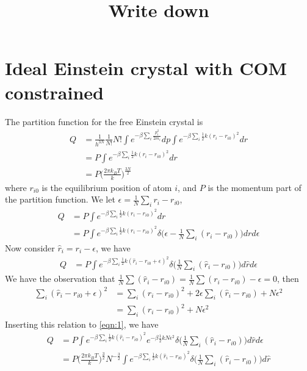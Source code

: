 \documentclass[aps,pre,a4paper,showkeys,fleqn]{revtex4}
\begin{document}
\title{
Write down
}

\maketitle

\section{Ideal Einstein crystal with COM constrained}

The partition function for the free Einstein crystal is
\begin{align*}
  Q & =
      \frac{1}{h^{3N}}
      \frac{1}{N!} N!
      \int e^{-\beta\sum_i\frac{p_i^2}{2m_i}} dp
      \int e^{-\beta\sum_i \frac 12k(r_i - r_{i0})^2} dr \\
    &= 
      P \int e^{-\beta\sum_i \frac 12k(r_i - r_{i0})^2} dr \\
    &=
      P \Big( \frac{2\pi k_BT}{k} \Big)^{\frac{3N}2}
\end{align*}
where $r_{i0}$ is the equilibrium position of atom $i$, and $P$ is the momentum part of the partition function.
We let $\epsilon = \frac1N \sum_i r_i - r_{i0}$,
\begin{align*}
  Q & =
      P \int e^{-\beta\sum_i \frac 12k(r_i - r_{i0})^2} dr \\
    & =
      P \int e^{-\beta\sum_i \frac 12k(r_i - r_{i0})^2} \delta\big( \epsilon - \frac1N \sum_i (r_i - r_{i0}) \big) dr d\epsilon 
\end{align*}
Now consider $\hat r_i = r_i - \epsilon$, we have
\begin{align}\label{eqn:1}
  Q & =
      P \int e^{-\beta\sum_i \frac 12k(\hat r_i - r_{i0} + \epsilon)^2} \delta\big( \frac1N \sum_i (\hat r_i - r_{i0}) \big) d\hat r d\epsilon 
\end{align}
We have the observation that $ \frac 1N \sum (\hat r_i  - r_{i0}) = \frac 1N \sum ( r_i  - r_{i0}) - \epsilon = 0$, then
\begin{align*}
  \sum_i (\hat r_i - r_{i0} + \epsilon)^2
  &=
    \sum_i (\hat r_i - r_{i0})^2 + 2\epsilon\sum_i (\hat r_i - r_{i0}) + N\epsilon^2 \\
  &=
    \sum_i (\hat r_i - r_{i0})^2 + N\epsilon^2 
\end{align*}
Inserting this relation to \eqref{eqn:1}, we have
\begin{align}\nonumber
  Q
  & =
    P \int e^{-\beta\sum_i \frac 12k(\hat r_i - r_{i0})^2} e^{-\beta \frac12 kN \epsilon^2} \delta\big( \frac1N \sum_i (\hat r_i - r_{i0}) \big) d\hat r d\epsilon \\
  &=
    P \Big( \frac{2\pi k_BT}k  \Big)^{\frac32} N^{-\frac32}
    \int e^{-\beta\sum_i \frac 12k(\hat r_i - r_{i0})^2} \delta\big( \frac1N \sum_i (\hat r_i - r_{i0}) \big) d\hat r
\end{align}
\end{document}
